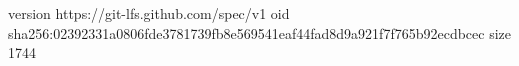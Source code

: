 version https://git-lfs.github.com/spec/v1
oid sha256:02392331a0806fde3781739fb8e569541eaf44fad8d9a921f7f765b92ecdbcec
size 1744
